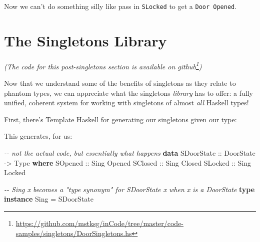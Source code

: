 \documentclass[]{article}
\newenvironment{Shaded}{}{}
\newcommand{\CommentTok}[1]{\textcolor[rgb]{0.38,0.63,0.69}{\textit{#1}}}
\newcommand{\DataTypeTok}[1]{\textcolor[rgb]{0.56,0.13,0.00}{#1}}
\newcommand{\KeywordTok}[1]{\textcolor[rgb]{0.00,0.44,0.13}{\textbf{#1}}}
\newcommand{\NormalTok}[1]{#1}
\newcommand{\OperatorTok}[1]{\textcolor[rgb]{0.40,0.40,0.40}{#1}}
\newcommand{\OtherTok}[1]{\textcolor[rgb]{0.00,0.44,0.13}{#1}}
\renewcommand{\href}[2]{#2\footnote{\url{#1}}}
\begin{document}
Now we can't do something silly like pass in \texttt{SLocked} to get a
\texttt{Door\ \textquotesingle{}Opened}.

\section{The Singletons Library}\label{the-singletons-library}

\emph{(The code for this post-singletons section is available
\href{https://github.com/mstksg/inCode/tree/master/code-samples/singletons/DoorSingletons.hs}{on
github})}

Now that we understand some of the benefits of singletons as they relate to
phantom types, we can appreciate what the singletons \emph{library} has to
offer: a fully unified, coherent system for working with singletons of almost
\emph{all} Haskell types!

First, there's Template Haskell for generating our singletons given our type:

\begin{Shaded}
\end{Shaded}

This generates, for us:

\begin{Shaded}
\begin{Highlighting}[]
\CommentTok{{-}{-} not the actual code, but essentially what happens}
\KeywordTok{data} \DataTypeTok{SDoorState}\OtherTok{ ::} \DataTypeTok{DoorState} \OtherTok{{-}\textgreater{}} \DataTypeTok{Type} \KeywordTok{where}
    \DataTypeTok{SOpened}\OtherTok{ ::} \DataTypeTok{Sing} \DataTypeTok{\textquotesingle{}Opened}
    \DataTypeTok{SClosed}\OtherTok{ ::} \DataTypeTok{Sing} \DataTypeTok{\textquotesingle{}Closed}
    \DataTypeTok{SLocked}\OtherTok{ ::} \DataTypeTok{Sing} \DataTypeTok{\textquotesingle{}Locked}

\CommentTok{{-}{-} Sing x becomes a "type synonym" for SDoorState x when x is a DoorState}
\KeywordTok{type} \KeywordTok{instance} \DataTypeTok{Sing} \OtherTok{=} \DataTypeTok{SDoorState}
\end{Highlighting}
\end{Shaded}
\end{document}
